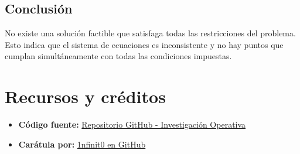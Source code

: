 \documentclass[12pt]{article}
\begin{document}
\vspace{0.5cm}

\centering
{}

\subsection*{Conclusión}
No existe una solución factible que satisfaga todas las restricciones del problema. Esto indica que el sistema de ecuaciones es inconsistente y no hay puntos que cumplan simultáneamente con todas las condiciones impuestas.




\newpage
\section*{Recursos y créditos}

\begin{itemize}
    \item \textbf{Código fuente:} \href{https://github.com/MateoTVara/C08-InvestigacionOperativa}{Repositorio GitHub - Investigación Operativa}
    \item \textbf{Carátula por:} \href{https://github.com/1nfinit0}{1nfinit0 en GitHub}
\end{itemize}
\end{document}
